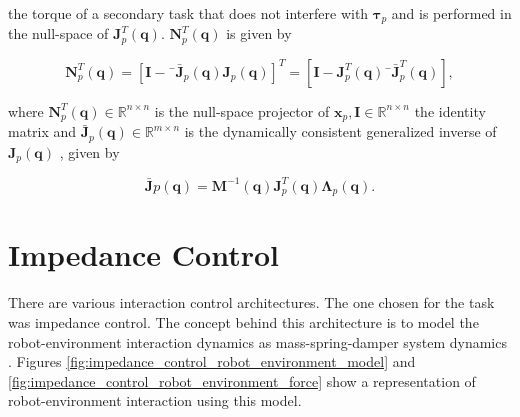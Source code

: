 the torque of a secondary task that does not interfere with $\boldsymbol{\tau}_p$ and is performed in the null-space of $\boldsymbol{J}^T_p (\boldsymbol{q})$. $\boldsymbol{N}^T_p(\boldsymbol{q})$ is given by 

\begin{equation}
    \boldsymbol{N}^T_p(\boldsymbol{q}) = [\boldsymbol{I} - ¯\boldsymbol{\bar{J}}_p(\boldsymbol{q}) \boldsymbol{J}_p(\boldsymbol{q})]^T = [\boldsymbol{I} - \boldsymbol{J}^T_p(\boldsymbol{q}) ¯\boldsymbol{\bar{J}}^T_p(\boldsymbol{q})],
\end{equation}

where $\boldsymbol{N}^T_p(\boldsymbol{q}) \in \mathbb{R}^{n\times n}$ is the null-space projector of $\boldsymbol{x}_p, \boldsymbol{I} \in \mathbb{R}^{n\times n}$ the identity matrix and $\boldsymbol{\bar{J}}_p(\boldsymbol{q}) \in \mathbb{R}^{m\times n}$ is the dynamically
consistent generalized inverse of $\boldsymbol{J}_p(\boldsymbol{q})$ \cite{Santos2018_computed_torque_control_robotic_assisted_tele_ecography}, given by 

\begin{equation}
    \boldsymbol{\bar{J}}p(\boldsymbol{q}) = \boldsymbol{M}^{-1}(\boldsymbol{q}) \boldsymbol{J}^T_p(\boldsymbol{q}) \boldsymbol{\Lambda}_p(\boldsymbol{q}).
\end{equation}


\section{Impedance Control}
\label{sec:control_architectures_impedance_control}

There are various interaction control architectures. The one chosen for the task was impedance control. The concept behind this architecture is to model the robot-environment interaction dynamics as mass-spring-damper system dynamics \cite{Ott2008_cartesian_impedance_control}. Figures \ref{fig:impedance_control_robot_environment_model} and \ref{fig:impedance_control_robot_environment_force} show a representation of robot-environment interaction using this model.

